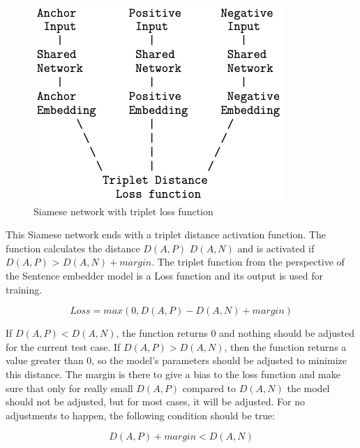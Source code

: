 \documentclass{wseas}
\begin{document}
\begin{figure}[htbp]
  \centering
  \includegraphics[width=\linewidth]{resources/v1/tripletLoss.png}
  \caption{Siamese network with triplet loss function}
  \label{fig:triplet_loss_function_figure}
\end{figure}

This Siamese network ends with a triplet distance activation function.
The function calculates the distance \(D(A,P)\) \(D(A,N)\) and is
activated if \(D(A,P)\) \textgreater{} \(D(A,N) + margin\). The
triplet function from the perspective of the Sentence embedder model is
a Loss function and its output is used for training. 

\begin{equation}
  Loss = max(0, D(A,P) - D(A,N) + margin) 
\end{equation}\cite{cite5}

If \(D(A,P) < D(A,N)\), the function returns 0 and nothing should be
adjusted for the current test case. If \(D(A,P) > D(A,N)\), then the
function returns a value greater than 0, so the model's parameters
should be adjusted to minimize this distance. The margin is there to
give a bias to the loss function and make sure that only for really
small \(D(A,P)\) compared to \(D(A,N)\) the model should not be
adjusted, but for most cases, it will be adjusted. For no adjustments to
happen, the following condition should be true:

\begin{equation}
  D(A,P) + margin < D(A,N)
\end{equation}
\end{document}
